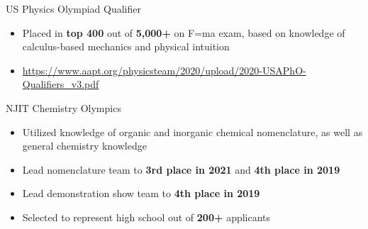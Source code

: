 \documentclass[12]{article}
\begin{document}
{US Physics Olympiad Qualifier}
{
  \begin{itemize}
  \item Placed in \textbf{top 400} out of \textbf{5,000+} on F=ma exam, based on knowledge of calculus-based mechanics and physical intuition
  \item \url{https://www.aapt.org/physicsteam/2020/upload/2020-USAPhO-Qualifiers\_v3.pdf}
  \end{itemize}
}
\vspace{-1\baselineskip}
{NJIT Chemistry Olympics}
{
  \begin{itemize}
  \item Utilized knowledge of organic and inorganic chemical nomenclature, as well as general chemistry knowledge
  \item Lead nomenclature team to \textbf{3rd place in 2021} and \textbf{4th place in 2019}
  \item Lead demonstration show team to \textbf{4th place in 2019}
  \item Selected to represent high school out of \textbf{200+} applicants
  \end{itemize}
}
\end{document}
